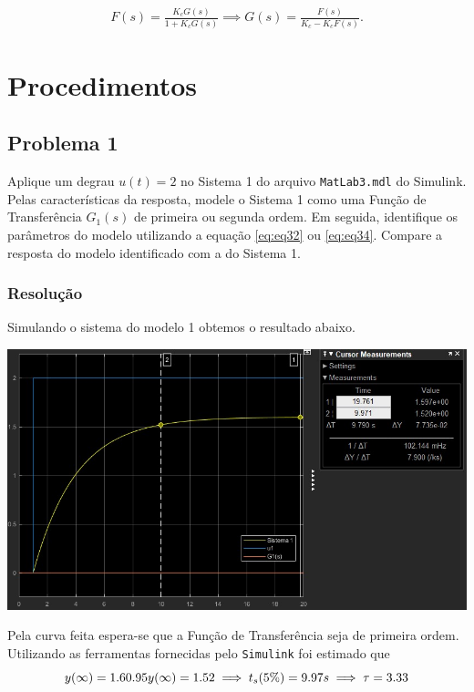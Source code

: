 \documentclass[
]{book}
\begin{document}
\begin{align}
F(s) = \frac {K_cG(s)}{1+K_cG(s)} \implies G(s) = \frac {F(s)}{K_c - K_cF(s)}.  \label{eq:eq35}
\end{align}

\hypertarget{procedimentos-1}{%
\section{Procedimentos}\label{procedimentos-1}}

\hypertarget{problema-1-1}{%
\subsection*{Problema 1}\label{problema-1-1}}

Aplique um degrau \(u(t) = 2\) no Sistema 1 do arquivo \texttt{MatLab3.mdl} do Simulink. Pelas características da resposta, modele o Sistema 1 como uma Função de Transferência \(G_1(s)%
\) de primeira ou segunda ordem. Em seguida, identifique os parâmetros do modelo utilizando a equação \eqref{eq:eq32} ou \eqref{eq:eq34}. Compare a resposta do modelo identificado com a do Sistema 1.

\hypertarget{resoluuxe7uxe3o-6}{%
\subsubsection*{Resolução}\label{resoluuxe7uxe3o-6}}

Simulando o sistema do modelo 1 obtemos o resultado abaixo.

\includegraphics{Imagens/Lab3/Resolução/prob1A.jpg}

Pela curva feita espera-se que a Função de Transferência seja de primeira ordem. Utilizando as ferramentas fornecidas pelo \texttt{Simulink} foi estimado que
\[
y(\infty) = 1.6 \\
0.95y(\infty) = 1.52 \implies  t_s(5\%) = 9.97s \implies \tau = 3.33
\]
\end{document}
